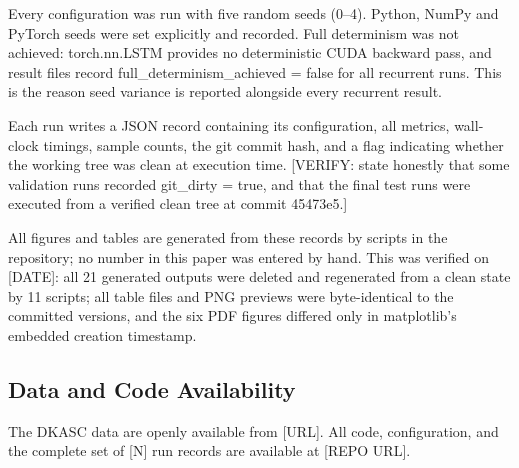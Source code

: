 Every configuration was run with five random seeds (0–4). Python, NumPy and PyTorch seeds were set explicitly and recorded. Full determinism was not achieved: torch.nn.LSTM provides no deterministic CUDA backward pass, and result files record full\_determinism\_achieved = false for all recurrent runs. This is the reason seed variance is reported alongside every recurrent result.

Each run writes a JSON record containing its configuration, all metrics, wall-clock timings, sample counts, the git commit hash, and a flag indicating whether the working tree was clean at execution time. [VERIFY: state honestly that some validation runs recorded git\_dirty = true, and that the final test runs were executed from a verified clean tree at commit 45473e5.]

All figures and tables are generated from these records by scripts in the repository; no number in this paper was entered by hand. This was verified on [DATE]: all 21 generated outputs were deleted and regenerated from a clean state by 11 scripts; all table files and PNG previews were byte-identical to the committed versions, and the six PDF figures differed only in matplotlib's embedded creation timestamp.

\subsection{Data and Code Availability}

The DKASC data are openly available from [URL]. All code, configuration, and the complete set of [N] run records are available at [REPO URL].
